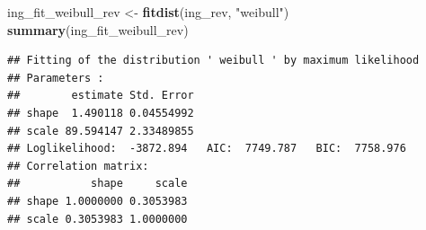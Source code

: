 \documentclass[
]{article}
\newenvironment{Shaded}{\begin{snugshade}}{\end{snugshade}}
\newcommand{\AttributeTok}[1]{\textcolor[rgb]{0.13,0.29,0.53}{#1}}
\newcommand{\ControlFlowTok}[1]{\textcolor[rgb]{0.13,0.29,0.53}{\textbf{#1}}}
\newcommand{\FloatTok}[1]{\textcolor[rgb]{0.00,0.00,0.81}{#1}}
\newcommand{\FunctionTok}[1]{\textcolor[rgb]{0.13,0.29,0.53}{\textbf{#1}}}
\newcommand{\NormalTok}[1]{#1}
\newcommand{\OtherTok}[1]{\textcolor[rgb]{0.56,0.35,0.01}{#1}}
\newcommand{\SpecialCharTok}[1]{\textcolor[rgb]{0.81,0.36,0.00}{\textbf{#1}}}
\newcommand{\StringTok}[1]{\textcolor[rgb]{0.31,0.60,0.02}{#1}}
\begin{document}
\begin{Shaded}
\begin{Highlighting}[]
\NormalTok{ing\_fit\_weibull\_rev }\OtherTok{\textless{}{-}} \FunctionTok{fitdist}\NormalTok{(ing\_rev, }\StringTok{"weibull"}\NormalTok{)}
\FunctionTok{summary}\NormalTok{(ing\_fit\_weibull\_rev)}
\end{Highlighting}
\end{Shaded}

\begin{verbatim}
## Fitting of the distribution ' weibull ' by maximum likelihood 
## Parameters : 
##        estimate Std. Error
## shape  1.490118 0.04554992
## scale 89.594147 2.33489855
## Loglikelihood:  -3872.894   AIC:  7749.787   BIC:  7758.976 
## Correlation matrix:
##           shape     scale
## shape 1.0000000 0.3053983
## scale 0.3053983 1.0000000
\end{verbatim}

\begin{Shaded}
\end{Shaded}
\end{document}
